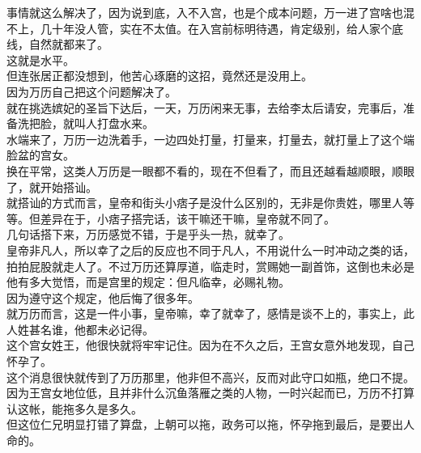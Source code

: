 \begin{multicols}{\theparacolNo}
事情就这么解决了，因为说到底，入不入宫，也是个成本问题，万一进了宫啥也混不上，几十年没人管，实在不太值。在入宫前标明待遇，肯定级别，给人家个底线，自然就都来了。\\

这就是水平。\\

但连张居正都没想到，他苦心琢磨的这招，竟然还是没用上。\\

因为万历自己把这个问题解决了。\\

就在挑选嫔妃的圣旨下达后，一天，万历闲来无事，去给李太后请安，完事后，准备洗把脸，就叫人打盘水来。\\

水端来了，万历一边洗着手，一边四处打量，打量来，打量去，就打量上了这个端脸盆的宫女。\\

换在平常，这类人万历是一眼都不看的，现在不但看了，而且还越看越顺眼，顺眼了，就开始搭讪。\\

就搭讪的方式而言，皇帝和街头小痞子是没什么区别的，无非是你贵姓，哪里人等等。但差异在于，小痞子搭完话，该干嘛还干嘛，皇帝就不同了。\\

几句话搭下来，万历感觉不错，于是乎头一热，就幸了。\\

皇帝非凡人，所以幸了之后的反应也不同于凡人，不用说什么一时冲动之类的话，拍拍屁股就走人了。不过万历还算厚道，临走时，赏赐她一副首饰，这倒也未必是他有多大觉悟，而是宫里的规定：但凡临幸，必赐礼物。\\

因为遵守这个规定，他后悔了很多年。\\

就万历而言，这是一件小事，皇帝嘛，幸了就幸了，感情是谈不上的，事实上，此人姓甚名谁，他都未必记得。\\

这个宫女姓王，他很快就将牢牢记住。因为在不久之后，王宫女意外地发现，自己怀孕了。\\

这个消息很快就传到了万历那里，他非但不高兴，反而对此守口如瓶，绝口不提。\\

因为王宫女地位低，且并非什么沉鱼落雁之类的人物，一时兴起而已，万历不打算认这帐，能拖多久是多久。\\

但这位仁兄明显打错了算盘，上朝可以拖，政务可以拖，怀孕拖到最后，是要出人命的。\\


\end{multicols}
